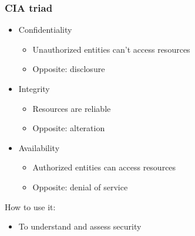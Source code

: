 \documentclass[blue]{beamer}
\begin{document}
\begin{frame}
\frametitle{CIA triad}

\begin{itemize}
  \item Confidentiality
  \begin{itemize}
    \item Unauthorized entities can't access resources
    \item Opposite: disclosure
  \end{itemize}
  \item Integrity
  \begin{itemize}
    \item Resources are reliable
    \item Opposite: alteration
  \end{itemize}
  \item Availability
  \begin{itemize}
    \item Authorized entities can access resources
    \item Opposite: denial of service
  \end{itemize}
\end{itemize}

\begin{alertblock}{How to use it:}

\begin{itemize}
  \item To understand and assess security
\end{itemize}
\end{alertblock}

\end{frame}
\end{document}
